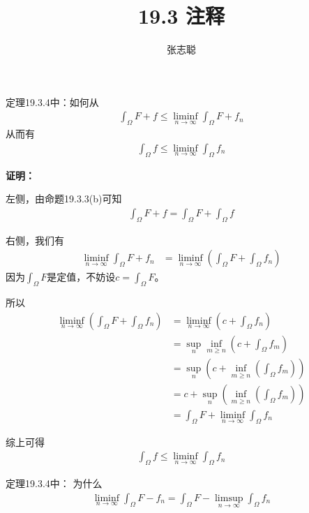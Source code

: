 \documentclass{article}
\begin{document}
\title{19.3 注释}
\author{张志聪}
\maketitle

\begin{zremark}
  定理19.3.4中：如何从
  \begin{align*}
    \int_{\Omega} F + f \leq \liminf\limits_{n \to \infty} \int_{\Omega} F + f_n
  \end{align*}
  从而有
  \begin{align*}
    \int_{\Omega} f \leq \liminf\limits_{n \to \infty} \int_{\Omega} f_n
  \end{align*}
\end{zremark}

\textbf{证明：}

左侧，由命题19.3.3(b)可知
\begin{align*}
  \int_{\Omega} F + f = \int_{\Omega} F + \int_{\Omega} f
\end{align*}

右侧，我们有
\begin{align*}
  \liminf\limits_{n \to \infty} \int_{\Omega} F + f_n
   & = \liminf\limits_{n \to \infty} \left(\int_{\Omega} F + \int_{\Omega} f_n\right)
\end{align*}
因为$\int_{\Omega} F$是定值，不妨设$c = \int_{\Omega} F$。

所以
\begin{align*}
  \liminf\limits_{n \to \infty} \left(\int_{\Omega} F + \int_{\Omega} f_n\right)
   & = \liminf\limits_{n \to \infty} \left(c + \int_{\Omega} f_n\right)                       \\
   & = \sup\limits_{n} \inf\limits_{m \geq n} \left(c + \int_{\Omega} f_m\right)              \\
   & = \sup\limits_{n} \left(c + \inf\limits_{m \geq n} \left(\int_{\Omega} f_m\right)\right) \\
   & = c + \sup\limits_{n} \left(\inf\limits_{m \geq n} \left(\int_{\Omega} f_m\right)\right) \\
   & = \int_{\Omega} F + \liminf\limits_{n \to \infty} \int_{\Omega} f_n
\end{align*}

综上可得
\begin{align*}
  \int_{\Omega} f \leq \liminf\limits_{n \to \infty} \int_{\Omega} f_n
\end{align*}

\begin{zremark}
  定理19.3.4中：
  为什么
  \begin{align*}
    \liminf\limits_{n \to \infty} \int_{\Omega} F - f_n
    =
    \int_{\Omega} F - \limsup\limits_{n \to \infty} \int_{\Omega} f_n
  \end{align*}
\end{zremark}
\end{document}
